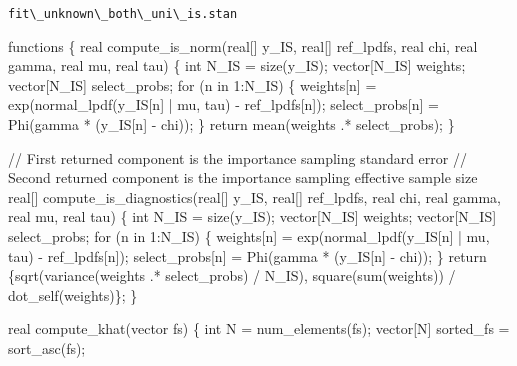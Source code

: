 \documentclass[
  letterpaper,
  DIV=11,
  numbers=noendperiod]{scrartcl}
\newenvironment{Shaded}{\begin{snugshade}}{\end{snugshade}}
\newcommand{\CommentTok}[1]{\textcolor[rgb]{0.37,0.37,0.37}{#1}}
\newcommand{\ControlFlowTok}[1]{\textcolor[rgb]{0.00,0.23,0.31}{#1}}
\newcommand{\DataTypeTok}[1]{\textcolor[rgb]{0.68,0.00,0.00}{#1}}
\newcommand{\DecValTok}[1]{\textcolor[rgb]{0.68,0.00,0.00}{#1}}
\newcommand{\KeywordTok}[1]{\textcolor[rgb]{0.00,0.23,0.31}{#1}}
\newcommand{\NormalTok}[1]{\textcolor[rgb]{0.00,0.23,0.31}{#1}}
\begin{document}
\begin{codelisting}

\caption{\texttt{fit\textbackslash\_unknown\textbackslash\_both\textbackslash\_uni\textbackslash\_is.stan}}

\begin{Shaded}
\begin{Highlighting}[]
\KeywordTok{functions}\NormalTok{ \{}
\DataTypeTok{real}\NormalTok{ compute\_is\_norm(}\DataTypeTok{real}\NormalTok{[] y\_IS, }\DataTypeTok{real}\NormalTok{[] ref\_lpdfs,}
                       \DataTypeTok{real}\NormalTok{ chi, }\DataTypeTok{real}\NormalTok{ gamma, }\DataTypeTok{real}\NormalTok{ mu, }\DataTypeTok{real}\NormalTok{ tau) \{}
    \DataTypeTok{int}\NormalTok{ N\_IS = size(y\_IS);}
    \DataTypeTok{vector}\NormalTok{[N\_IS] weights;}
    \DataTypeTok{vector}\NormalTok{[N\_IS] select\_probs;}
    \ControlFlowTok{for}\NormalTok{ (n }\ControlFlowTok{in} \DecValTok{1}\NormalTok{:N\_IS) \{}
\NormalTok{      weights[n] = exp(normal\_lpdf(y\_IS[n] | mu, tau) {-} ref\_lpdfs[n]);}
\NormalTok{      select\_probs[n] = Phi(gamma * (y\_IS[n] {-} chi));}
\NormalTok{    \}}
    \ControlFlowTok{return}\NormalTok{ mean(weights .* select\_probs);}
\NormalTok{  \}}

  \CommentTok{// First returned component is the importance sampling standard error}
  \CommentTok{// Second returned component is the importance sampling effective sample size}
  \DataTypeTok{real}\NormalTok{[] compute\_is\_diagnostics(}\DataTypeTok{real}\NormalTok{[] y\_IS, }\DataTypeTok{real}\NormalTok{[] ref\_lpdfs,}
                                \DataTypeTok{real}\NormalTok{ chi, }\DataTypeTok{real}\NormalTok{ gamma,}
                                \DataTypeTok{real}\NormalTok{ mu, }\DataTypeTok{real}\NormalTok{ tau) \{}
    \DataTypeTok{int}\NormalTok{ N\_IS = size(y\_IS);}
    \DataTypeTok{vector}\NormalTok{[N\_IS] weights;}
    \DataTypeTok{vector}\NormalTok{[N\_IS] select\_probs;}
    \ControlFlowTok{for}\NormalTok{ (n }\ControlFlowTok{in} \DecValTok{1}\NormalTok{:N\_IS) \{}
\NormalTok{      weights[n] = exp(normal\_lpdf(y\_IS[n] | mu, tau) {-} ref\_lpdfs[n]);}
\NormalTok{      select\_probs[n] = Phi(gamma * (y\_IS[n] {-} chi));}
\NormalTok{    \}}
    \ControlFlowTok{return}\NormalTok{ \{sqrt(variance(weights .* select\_probs) / N\_IS),}
\NormalTok{            square(sum(weights)) / dot\_self(weights)\};}
\NormalTok{  \}}

  \DataTypeTok{real}\NormalTok{ compute\_khat(}\DataTypeTok{vector}\NormalTok{ fs) \{}
    \DataTypeTok{int}\NormalTok{ N = num\_elements(fs);}
    \DataTypeTok{vector}\NormalTok{[N] sorted\_fs = sort\_asc(fs);}


\end{Highlighting}
\end{Shaded}
\end{codelisting}
\end{document}
